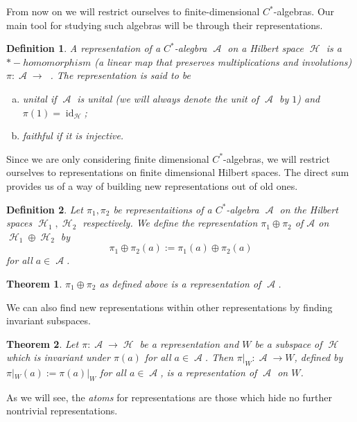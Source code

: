 \documentclass{article}
\newtheorem{definition}{Definition}
\newtheorem{theorem}{Theorem}
\DeclareMathOperator{\A}{\mathcal{A}}
\DeclareMathOperator{\Hil}{\mathcal{H}}
\DeclareMathOperator{\BH}{\mathcal{B}(\Hil)}
\DeclareMathOperator{\id}{id}
\begin{document}
From now on we will restrict ourselves to finite-dimensional $C^*$-algebras. Our main tool for studying such algebras will be through their representations.

\begin{definition}
A representation of a $C^*$-alegbra $\A$ on a Hilbert space $\Hil$ is a $*-homomorphism$ (a linear map that preserves multiplications and involutions) $\pi:\A\rightarrow\BH$. The representation is said to be
\begin{enumerate}[(a)]

\item unital if $\A$ is unital (we will always denote the unit of $\A$ by $1$) and $\pi(1)=\id_{\Hil}$;

\item faithful if it is injective.

\end{enumerate}
\end{definition}

Since we are only considering finite dimensional $C^*$-algebras, we will restrict ourselves to representations on finite dimensional Hilbert spaces. The direct sum provides us of a way of building new representations out of old ones.

\begin{definition}
Let $\pi_1,\pi_2$ be representaitions of a $C^*$-algebra $\A$ on the Hilbert spaces $\Hil_1,\Hil_2$ respectively. We define the representation $\pi_1\oplus\pi_2$ of $\mathcal{A}$ on $\Hil_1\oplus\Hil_2$ by
\begin{equation}
\pi_1\oplus\pi_2(a):=\pi_1(a)\oplus\pi_2(a)
\end{equation} 
for all $a\in\A$.
\end{definition}

\begin{theorem}
$\pi_1\oplus\pi_2$ as defined above is a representation of $\A$.
\end{theorem}

We can also find new representations within other representations by finding invariant subspaces.

\begin{theorem}
Let $\pi:\A\rightarrow\Hil$ be a representation and $W$ be a subspace of $\Hil$ which is invariant under $\pi(a)$ for all $a\in\A$. Then $\pi|_W:\A\rightarrow W$, defined by $\pi|_W(a):=\pi(a)|_W$ for all $a\in\A$, is a representation of $\A$ on $W$. 
\end{theorem}

As we will see, the \textit{atoms} for representations are those which hide no further nontrivial representations.
\end{document}
